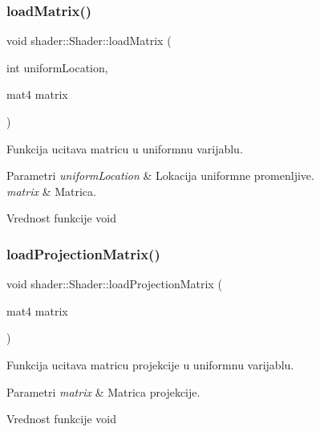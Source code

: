 \subsubsection{\texorpdfstring{load\+Matrix()}{loadMatrix()}}
{\footnotesize\ttfamily void shader\+::\+Shader\+::load\+Matrix (\begin{DoxyParamCaption}\item[{int}]{uniform\+Location,  }\item[{mat4}]{matrix }\end{DoxyParamCaption})}



Funkcija ucitava matricu u uniformnu varijablu. 


\begin{DoxyParams}{Parametri}
{\em uniform\+Location} & Lokacija uniformne promenljive. \\
\hline
{\em matrix} & Matrica. \\
\hline
\end{DoxyParams}
\begin{DoxyReturn}{Vrednost funkcije}
void 
\end{DoxyReturn}
\mbox{\label{classshader_1_1Shader_a574d7ff5ab4870990795f72014e1aa1e}} 
\subsubsection{\texorpdfstring{load\+Projection\+Matrix()}{loadProjectionMatrix()}}
{\footnotesize\ttfamily void shader\+::\+Shader\+::load\+Projection\+Matrix (\begin{DoxyParamCaption}\item[{mat4}]{matrix }\end{DoxyParamCaption})}



Funkcija ucitava matricu projekcije u uniformnu varijablu. 


\begin{DoxyParams}{Parametri}
{\em matrix} & Matrica projekcije. \\
\hline
\end{DoxyParams}
\begin{DoxyReturn}{Vrednost funkcije}
void 
\end{DoxyReturn}
\mbox{\label{classshader_1_1Shader_aeabeeeb9e04b2704d6b22ff4a472afae}} 
